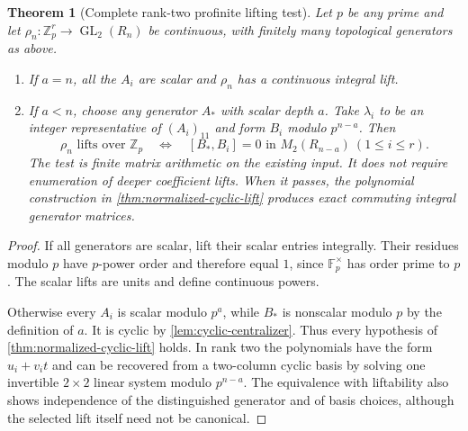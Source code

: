 \documentclass[11pt]{article}
\newtheorem{theorem}{Theorem}[section]
\theoremstyle{definition}
\theoremstyle{remark}
\begin{document}
\begin{theorem}[Complete rank-two profinite lifting test]\label{thm:rank-two-profinite}
Let $p$ be any prime and let $\rho_n:\mathbb Z_p^r\to\operatorname{GL}_2(R_n)$ be continuous, with finitely many topological generators as above.
\begin{enumerate}
\item If $a=n$, all the $A_i$ are scalar and $\rho_n$ has a continuous integral lift.
\item If $a<n$, choose any generator $A_*$ with scalar depth $a$. Take $\lambda_i$ to be an integer representative of $(A_i)_{11}$ and form $B_i$ modulo $p^{n-a}$. Then
\[
 \boxed{\rho_n\text{ lifts over }\mathbb Z_p
 \quad\Longleftrightarrow\quad
 [B_*,B_i]=0\text{ in }M_2(R_{n-a})\ (1\leq i\leq r).}
\]
The test is finite matrix arithmetic on the \emph{existing input}. It does not require enumeration of deeper coefficient lifts. When it passes, the polynomial construction in \cref{thm:normalized-cyclic-lift} produces exact commuting integral generator matrices.
\end{enumerate}
\end{theorem}
\begin{proof}
If all generators are scalar, lift their scalar entries integrally. Their residues modulo $p$ have $p$-power order and therefore equal $1$, since $\mathbb F_p^\times$ has order prime to $p$. The scalar lifts are units and define continuous powers.

Otherwise every $A_i$ is scalar modulo $p^a$, while $B_*$ is nonscalar modulo $p$ by the definition of $a$. It is cyclic by \cref{lem:cyclic-centralizer}. Thus every hypothesis of \cref{thm:normalized-cyclic-lift} holds. In rank two the polynomials have the form $u_i+v_it$ and can be recovered from a two-column cyclic basis by solving one invertible $2\times2$ linear system modulo $p^{n-a}$. The equivalence with liftability also shows independence of the distinguished generator and of basis choices, although the selected lift itself need not be canonical.
\end{proof}
\end{document}
